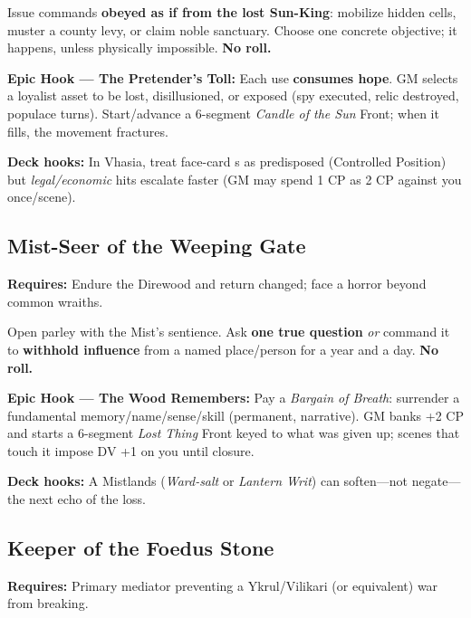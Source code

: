 \begin{tcolorbox}[enhanced,sharp corners,boxrule=.6pt,title={Talent — The Sunburst Warrant (18 XP, 1/campaign)}]
Issue commands \textbf{obeyed as if from the lost Sun-King}: mobilize hidden cells, muster a county levy, or claim noble sanctuary. Choose one concrete objective; it happens, unless physically impossible. \textbf{No roll.}
\end{tcolorbox}

\textbf{Epic Hook — The Pretender's Toll:} Each use \textbf{consumes hope}. GM selects a loyalist asset to be lost, disillusioned, or exposed (spy executed, relic destroyed, populace turns). Start/advance a 6-segment \emph{Candle of the Sun} Front; when it fills, the movement fractures.

\textbf{Deck hooks:} In Vhasia, treat face-card \SuitHeart{}s as predisposed (Controlled Position) but \SuitClub{} \emph{legal/economic} hits escalate faster (GM may spend 1 CP as 2 CP against you once/scene).

\subsection{Mist-Seer of the Weeping Gate}
\textbf{Requires:} Endure the Direwood and return changed; face a horror beyond common wraiths.

\begin{tcolorbox}[enhanced,sharp corners,boxrule=.6pt,title={Talent — Bargain with the Deep Mist (20 XP, 1/campaign)}]
Open parley with the Mist's sentience. Ask \textbf{one true question} \emph{or} command it to \textbf{withhold influence} from a named place/person for a year and a day. \textbf{No roll.}
\end{tcolorbox}

\textbf{Epic Hook — The Wood Remembers:} Pay a \emph{Bargain of Breath}: surrender a fundamental memory/name/sense/skill (permanent, narrative). GM banks +2 CP and starts a 6-segment \emph{Lost Thing} Front keyed to what was given up; scenes that touch it impose DV +1 on you until closure.

\textbf{Deck hooks:} A Mistlands \SuitDiamond{} (\emph{Ward-salt} or \emph{Lantern Writ}) can soften—not negate—the next echo of the loss.

\subsection{Keeper of the Foedus Stone}
\textbf{Requires:} Primary mediator preventing a Ykrul/Vilikari (or equivalent) war from breaking.

